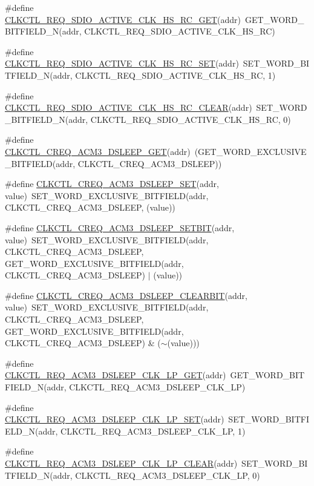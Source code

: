 \begin{DoxyCompactItemize}
\item 
\#define \hyperlink{a00544_a9a50fd911931580c1651269a3ae3123e}{CLKCTL\_\-REQ\_\-SDIO\_\-ACTIVE\_\-CLK\_\-HS\_\-RC\_\-GET}(addr)~GET\_\-WORD\_\-BITFIELD\_\-N(addr, CLKCTL\_\-REQ\_\-SDIO\_\-ACTIVE\_\-CLK\_\-HS\_\-RC)
\item 
\#define \hyperlink{a00544_ab1ebcc5a1f3c36a67ba5e8bbc156fe51}{CLKCTL\_\-REQ\_\-SDIO\_\-ACTIVE\_\-CLK\_\-HS\_\-RC\_\-SET}(addr)~SET\_\-WORD\_\-BITFIELD\_\-N(addr, CLKCTL\_\-REQ\_\-SDIO\_\-ACTIVE\_\-CLK\_\-HS\_\-RC, 1)
\item 
\#define \hyperlink{a00544_af6544e2187624cca9200c08e1863d813}{CLKCTL\_\-REQ\_\-SDIO\_\-ACTIVE\_\-CLK\_\-HS\_\-RC\_\-CLEAR}(addr)~SET\_\-WORD\_\-BITFIELD\_\-N(addr, CLKCTL\_\-REQ\_\-SDIO\_\-ACTIVE\_\-CLK\_\-HS\_\-RC, 0)
\item 
\#define \hyperlink{a00544_ad01c1d0d7d0716374e1cfaab525f4362}{CLKCTL\_\-CREQ\_\-ACM3\_\-DSLEEP\_\-GET}(addr)~(GET\_\-WORD\_\-EXCLUSIVE\_\-BITFIELD(addr, CLKCTL\_\-CREQ\_\-ACM3\_\-DSLEEP))
\item 
\#define \hyperlink{a00544_aeaf4227a8890451ae33a079ef3256c73}{CLKCTL\_\-CREQ\_\-ACM3\_\-DSLEEP\_\-SET}(addr, value)~SET\_\-WORD\_\-EXCLUSIVE\_\-BITFIELD(addr, CLKCTL\_\-CREQ\_\-ACM3\_\-DSLEEP, (value))
\item 
\#define \hyperlink{a00544_a421ac526504db1438ce6da662326ea29}{CLKCTL\_\-CREQ\_\-ACM3\_\-DSLEEP\_\-SETBIT}(addr, value)~SET\_\-WORD\_\-EXCLUSIVE\_\-BITFIELD(addr, CLKCTL\_\-CREQ\_\-ACM3\_\-DSLEEP, GET\_\-WORD\_\-EXCLUSIVE\_\-BITFIELD(addr, CLKCTL\_\-CREQ\_\-ACM3\_\-DSLEEP) $|$ (value))
\item 
\#define \hyperlink{a00544_a9adbf89c828070eb36e3f79bf137ae7f}{CLKCTL\_\-CREQ\_\-ACM3\_\-DSLEEP\_\-CLEARBIT}(addr, value)~SET\_\-WORD\_\-EXCLUSIVE\_\-BITFIELD(addr, CLKCTL\_\-CREQ\_\-ACM3\_\-DSLEEP, GET\_\-WORD\_\-EXCLUSIVE\_\-BITFIELD(addr, CLKCTL\_\-CREQ\_\-ACM3\_\-DSLEEP) \& ($\sim$(value)))
\item 
\#define \hyperlink{a00544_a837ff932a87666b89205454a468a38a4}{CLKCTL\_\-REQ\_\-ACM3\_\-DSLEEP\_\-CLK\_\-LP\_\-GET}(addr)~GET\_\-WORD\_\-BITFIELD\_\-N(addr, CLKCTL\_\-REQ\_\-ACM3\_\-DSLEEP\_\-CLK\_\-LP)
\item 
\#define \hyperlink{a00544_a988a033168d1e8fd996c199f9431ffe1}{CLKCTL\_\-REQ\_\-ACM3\_\-DSLEEP\_\-CLK\_\-LP\_\-SET}(addr)~SET\_\-WORD\_\-BITFIELD\_\-N(addr, CLKCTL\_\-REQ\_\-ACM3\_\-DSLEEP\_\-CLK\_\-LP, 1)
\item 
\#define \hyperlink{a00544_abe6513536ec4ce48253b6b189045f4b0}{CLKCTL\_\-REQ\_\-ACM3\_\-DSLEEP\_\-CLK\_\-LP\_\-CLEAR}(addr)~SET\_\-WORD\_\-BITFIELD\_\-N(addr, CLKCTL\_\-REQ\_\-ACM3\_\-DSLEEP\_\-CLK\_\-LP, 0)

\end{DoxyCompactItemize}
